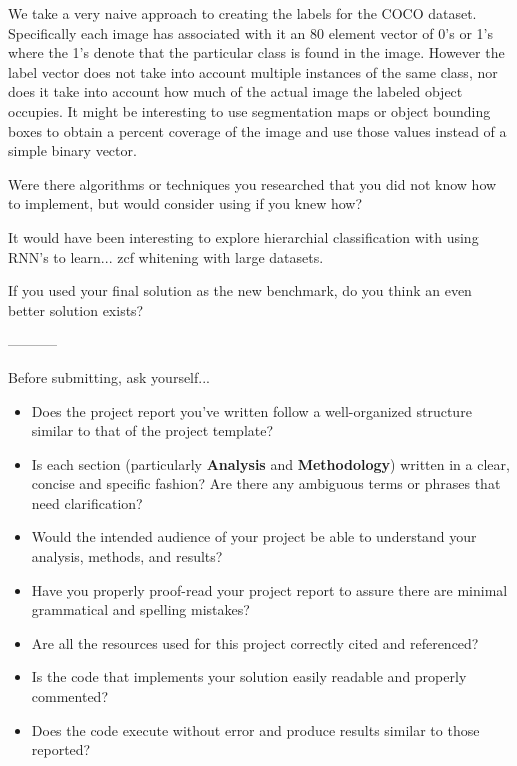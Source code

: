 \documentclass[12pt,journal,compsoc]{IEEEtran}
\begin{document}

We take a very naive approach to creating the labels for the COCO dataset.  Specifically each image has associated with it an 80 element vector of 0's or 1's where the 1's denote that the particular class is found in the image.  However the label vector does not take into account multiple instances of the same class, nor does it take into account how much of the actual image the labeled object occupies.  It might be interesting to use segmentation maps or object bounding boxes to obtain a percent coverage of the image and use those values instead of a simple binary vector.

Were there algorithms or techniques you researched that you did not know how to implement, but would consider using if you knew how?

It would have been interesting to explore hierarchial classification with using RNN's to learn...
zcf whitening with large datasets.

If you used your final solution as the new benchmark, do you think an even better solution exists?

-----------

Before submitting, ask yourself...
\begin{itemize}

  \item Does the project report you’ve written follow a well-organized structure similar to that of the project template?
  \item Is each section (particularly \textbf{Analysis} and \textbf{Methodology}) written in a clear, concise and specific fashion? Are there any ambiguous terms or phrases that need clarification?
  \item Would the intended audience of your project be able to understand your analysis, methods, and results?
  \item Have you properly proof-read your project report to assure there are minimal grammatical and spelling mistakes?
  \item Are all the resources used for this project correctly cited and referenced?
  \item Is the code that implements your solution easily readable and properly commented?
  \item Does the code execute without error and produce results similar to those reported?

\end{itemize}
\end{document}
